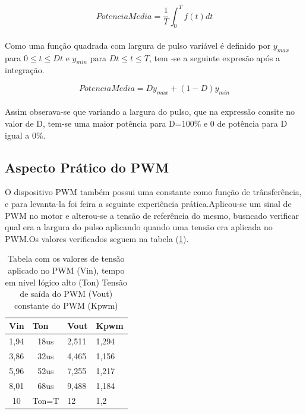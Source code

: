 \documentclass[11pt, a4paper, oneside]{article}
\begin{document}
\begin{equation}
\label{Potencia media}
Potencia Media=\frac{1}{T}{}\int_{0}^{T}f(t)dt 
\end{equation}
\\

Como uma função quadrada com largura de pulso variável é definido por $y_{max}$ para $0\leq t\leq Dt$ e $y_{min}$ para $
Dt\leq t\leq T$, tem -se a seguinte expresão após a integração.

\begin{equation}
Potencia Media=Dy_{max}+(1-D)y_{min} 
\end{equation}
\\
Assim obserava-se que variando a largura do pulso, que na expressão consite no valor de D, tem-se uma maior potência para D=100\% e 0 de potência para D igual a 0\%.

\subsection{Aspecto Prático do PWM}
O dispositivo PWM também possui uma constante como função de trânsferência, e para levanta-la foi feira a seguinte experiência prática.Aplicou-se um sinal de PWM no motor e alterou-se a tensão de referência do mesmo, busncado verificar qual era a largura do pulso aplicando quando uma tensão era aplicada no PWM.Os valores verificados seguem na tabela (\ref{TabelaPWM}).

\begin{table}[h!]
\centering
\caption{Tabela com os valores de tensão aplicado no PWM (Vin), tempo em nivel lógico alto (Ton) Tensão de saída do PWM (Vout) constante do PWM (Kpwm)}
\label{TabelaPWM}
\begin{tabular}{|c|c|l|l|}
\hline
\multicolumn{1}{|l|}{Vin} & \multicolumn{1}{l|}{Ton} & Vout  & Kpwm  \\ \hline
1,94                      & 18us                     & 2,511 & 1,294 \\ \hline
3,86                      & 32us                     & 4,465 & 1,156 \\ \hline
5,96                      & 52us                     & 7,255 & 1,217 \\ \hline
8,01                      & 68us                     & 9,488 & 1,184 \\ \hline
10                        & Ton=T                    & 12    &  1,2     \\ \hline
\end{tabular}
\end{table}
\end{document}
